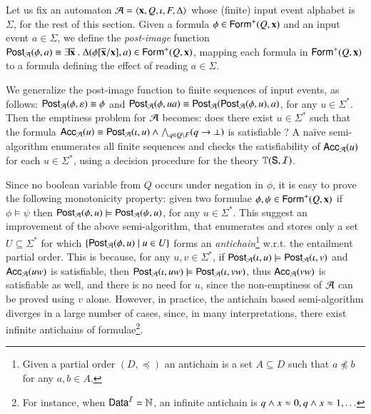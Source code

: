 \documentclass{llncs}
\begin{document}
Let us fix an automaton $\mathcal{A} = \left\langle \mathbf x,Q,\iota,F,\Delta \right\rangle$ whose
(finite) input event alphabet is $\Sigma$, for the rest of this
section. Given a formula $\phi \in \mathsf{Form}^+(Q,\mathbf x)$ and an input
event $a \in \Sigma$, we define the \emph{post-image} function
$\mathsf{Post}_{\mathcal{A}}(\phi,a) \equiv \exists \overline{\mathbf x} ~.~
\Delta(\phi[\overline{\mathbf x}/\mathbf x], a) \in \mathsf{Form}^+(Q,\mathbf x)$,
mapping each formula in $\mathsf{Form}^+(Q,\mathbf x)$ to a formula defining the
effect of reading $a \in \Sigma$.

We generalize the post-image function to finite sequences of input
events, as follows: $\mathsf{Post}_{\mathcal{A}}(\phi,\varepsilon) \equiv \phi$ and
$\mathsf{Post}_{\mathcal{A}}(\phi,ua) \equiv \mathsf{Post}_{\mathcal{A}}(\mathsf{Post}_{\mathcal{A}}(\phi,u),a)$, for any $u
\in \Sigma^*$. Then the emptiness problem for $\mathcal{A}$ becomes: does there
exist $u \in \Sigma^*$ such that the formula $\mathsf{Acc}_{\mathcal{A}}(u) \equiv
\mathsf{Post}_{\mathcal{A}}(\iota,u) \wedge \bigwedge_{q \in Q \setminus F} (q
\rightarrow \bot)$ is satisfiable ? A na\"ive semi-algorithm
enumerates all finite sequences and checks the satisfiability of
$\mathsf{Acc}_{\mathcal{A}}(u)$ for each $u \in \Sigma^*$, using a decision procedure
for the theory $\mathbb{T}(\mathsf{S},\mathcal{I})$.

Since no boolean variable from $Q$ occurs under negation in $\phi$, it
is easy to prove the following monotonicity property: given two
formulae $\phi,\psi \in \mathsf{Form}^+(Q,\mathbf x)$ if $\phi \models \psi$
then $\mathsf{Post}_{\mathcal{A}}(\phi,u) \models \mathsf{Post}_{\mathcal{A}}(\psi,u)$, for any $u \in
\Sigma^*$. This suggest an improvement of the above semi-algorithm,
that enumerates and stores only a set $U \subseteq \Sigma^*$ for which
$\left\{ \mathsf{Post}_{\mathcal{A}}(\phi,u) \mid u \in U \right\}$ forms an
\emph{antichain}\footnote{Given a partial order $(D,\preceq)$ an
  antichain is a set $A \subseteq D$ such that $a \not\preceq b$ for
  any $a,b \in A$.} w.r.t. the entailment partial order. This is
because, for any $u,v \in \Sigma^*$, if $\mathsf{Post}_{\mathcal{A}}(\iota,u) \models
\mathsf{Post}_{\mathcal{A}}(\iota,v)$ and $\mathsf{Acc}_{\mathcal{A}}(uw)$ is satisfiable, then
$\mathsf{Post}_{\mathcal{A}}(\iota,uw) \models \mathsf{Post}_{\mathcal{A}}(\iota,vw)$, thus
$\mathsf{Acc}_{\mathcal{A}}(vw)$ is satisfiable as well, and there is no need for
$u$, since the non-emptiness of $\mathcal{A}$ can be proved using $v$
alone. However, in practice, the antichain based semi-algorithm
diverges in a large number of cases, since, in many interpretations,
there exist infinite antichains of formulae\footnote{For instance,
  when $\mathsf{Data}^{\mathcal{I}} = {\bf \mathbb{N}}$, an infinite antichain is $q \wedge x \approx 0,
  q \wedge x \approx 1, \ldots$}.
\end{document}
